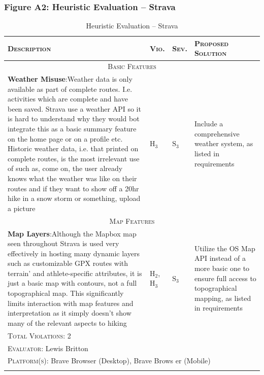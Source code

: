\documentclass[11pt, english]{article}
\begin{document}
\newpage

		\subsubsection*{Figure A2: Heuristic Evaluation -- Strava}

	\begin{center}
                \scriptsize
        \begin{longtable}{p{7.5cm}p{0.5cm}p{0.5cm}p{4cm}}
                \textsc{Description} & \textsc{Vio.} & \textsc{Sev.} & \textsc{Proposed Solution}\\
		\hline
		\multicolumn{4}{c}{\textsc{Basic Features}}\\
		\hline
			\textbf{Weather Misuse}:\newline Weather data is only available as part of complete routes. I.e. activities which are complete and have been saved. Strava use a weather API so it is hard to understand why they would bot integrate this as a basic summary feature on the home page or on a profile etc. Historic weather data, i.e. that printed on complete routes, is the most irrelevant use of such as, come on, the user already knows what the weather was like on their routes and if they want to show off a 20hr hike in a snow storm or something, upload a picture & $\mathrm{H_{3}}$ & $\mathrm{S_{3}}$ & Include a comprehensive weather system, as listed in requirements\\
		\hline
		\multicolumn{4}{c}{\textsc{Map Features}}\\
		\hline
			\textbf{Map Layers}:\newline Although the Mapbox map seen throughout Strava is used very effectively in hosting many dynamic layers such as customizable GPX routes with terrain' and athlete-specific attributes, it is just a basic map with contours, not a full topographical map. This significantly limits interaction with map features and interpretation as it simply doesn't show many of the relevant aspects to hiking & $\mathrm{H_{2}}$, $\mathrm{H_{3}}$ & $\mathrm{S_{3}}$ & Utilize the OS Map API instead of a more basic one to ensure full access to topographical mapping, as listed in requirements\\
		\hline
                \multicolumn{4}{l}{\textsc{Total Violations}: 2}\\
                \multicolumn{4}{l}{\textsc{Evaluator}: Lewis Britton}\\
                \multicolumn{4}{l}{\textsc{Platform(s)}: Brave Browser (Desktop), Brave Brows
er (Mobile)}\\
                \hline
                \caption{Heuristic Evaluation -- Strava}
        \end{longtable}
        \end{center}
\end{document}
